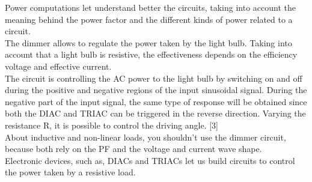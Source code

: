 \documentclass[journal]{IEEEtran}
\begin{document}
Power computations let understand better the 
circuits, taking into account the meaning behind the 
power factor and the different kinds of 
power related to a circuit.\\

The dimmer allows to regulate the power taken by the 
light bulb. Taking into account that a light bulb is 
resistive, the effectiveness depends on the efficiency 
voltage and effective current. \\

The circuit is controlling the AC power to the light bulb 
by switching on and off during the positive and negative 
regions of the input sinusoidal signal. During the 
negative part of the input signal, the same type of 
response will be obtained since both the DIAC and TRIAC 
can be triggered in the reverse direction. Varying the 
resistance R, it is possible to control the driving 
angle. [3]\\

About inductive and non-linear loads, you shouldn't use 
the dimmer circuit, because both rely on the PF and the
voltage and current wave shape.\\

Electronic devices, such as,
DIACs and TRIACs let us build circuits to control the 
power taken by a resistive load.\\

\end{document}
